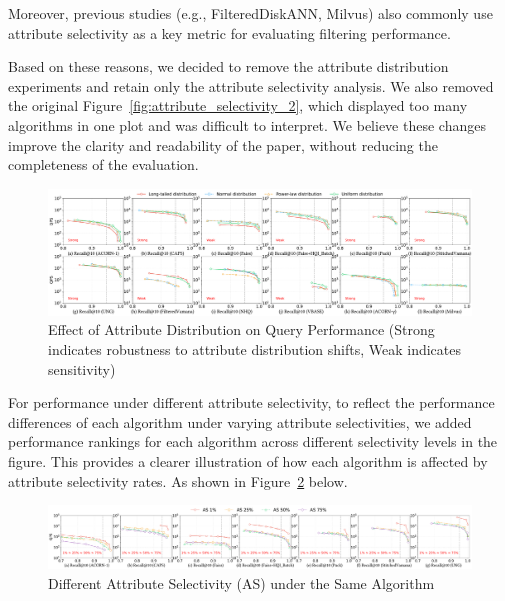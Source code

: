 \documentclass[sigconf, nonacm]{acmart}
\begin{document}
Moreover, previous studies (e.g., FilteredDiskANN, Milvus) also commonly use attribute selectivity as a key metric for evaluating filtering performance.

Based on these reasons, we decided to remove the attribute distribution experiments and retain only the attribute selectivity analysis. We also removed the original Figure~\ref{fig:attribute_selectivity_2}, which displayed too many algorithms in one plot and was difficult to interpret. We believe these changes improve the clarity and readability of the paper, without reducing the completeness of the evaluation.


\begin{figure}[t]  %
	\centering
	\includegraphics[width=\linewidth]{fig/exp_3_1.pdf}
	\caption{Effect of Attribute Distribution on Query Performance (Strong indicates robustness to attribute distribution shifts, Weak indicates sensitivity)}
	\label{fig:attribute_distribution}
\end{figure}

For performance under different attribute selectivity, to reflect the performance differences of each algorithm under varying attribute selectivities, we added performance rankings for each algorithm across different selectivity levels in the figure. This provides a clearer illustration of how each algorithm is affected by attribute selectivity rates. As shown in Figure~\ref{fig:attribute_selectivity} below.

\begin{figure}[t]  %
	\centering
	\includegraphics[width=\linewidth]{fig/exp_5_2_1.pdf}
	\caption{Different Attribute Selectivity (AS) under the Same Algorithm}
	\label{fig:attribute_selectivity}
\end{figure}
\end{document}
